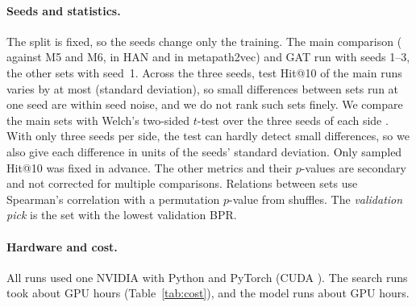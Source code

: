 \paragraph{Seeds and statistics.} The split is fixed, so the seeds change only the training. The
main comparison ( against M5 and M6, in HAN and in metapath2vec) and GAT run with seeds
1--3, the other sets with seed~1. Across the three seeds, test Hit@10 of the main runs varies by at
most  (standard deviation), so small differences between sets run at one seed
are within seed noise, and we do not rank such sets finely. We compare the main sets with Welch's
two-sided $t$-test over the three seeds of each side \citep{welch1947generalization}. With only
three seeds per side, the test can hardly detect small differences, so we also give each difference
in units of the seeds' standard deviation. Only sampled Hit@10 was fixed in advance. The other
metrics and their $p$-values are secondary and not corrected for multiple comparisons. Relations
between sets use Spearman's correlation with a permutation $p$-value from 
shuffles. The \emph{validation pick} is the set with the lowest validation BPR.

\paragraph{Hardware and cost.} All runs used one NVIDIA  with Python 
and PyTorch  (CUDA ). The  search runs took about
 GPU hours (Table~\ref{tab:cost}), and the model runs about 
GPU hours.
